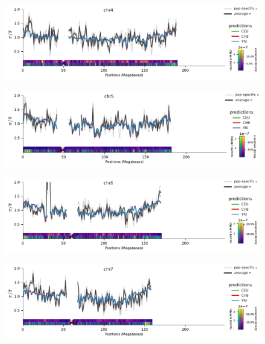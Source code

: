 \documentclass[11pt]{article}
\begin{document}
\begin{figure}[!htb]
  \centering
  \includegraphics[width=\textwidth]{figures/supplementary/pred_plot_chr4.pdf}
  \label{suppfig:fit-chr4}
\end{figure}


\begin{figure}[!htb]
  \centering
  \includegraphics[width=\textwidth]{figures/supplementary/pred_plot_chr5.pdf}
  \label{suppfig:fit-chr5}
\end{figure}


\begin{figure}[!htb]
  \centering
  \includegraphics[width=\textwidth]{figures/supplementary/pred_plot_chr6.pdf}
  \label{suppfig:fit-chr6}
\end{figure}


\begin{figure}[!htb]
  \centering
  \includegraphics[width=\textwidth]{figures/supplementary/pred_plot_chr7.pdf}
  \label{suppfig:fit-chr7}
\end{figure}
\end{document}

